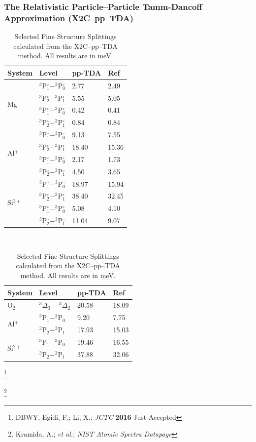 \documentclass[usepdftitle=false,10pt]{beamer}
\newcommand\blfootnote[1]{%
  \begingroup
  \renewcommand\thefootnote{}\footnote{#1}%
  \addtocounter{footnote}{-1}%
  \endgroup
}
\begin{document}
\begin{frame}
  \frametitle{The Relativistic Particle--Particle Tamm-Dancoff Approximation 
  (X2C--pp--TDA)}
  {\scriptsize
  \begin{table}
    \centering
    \begin{tabular}{llll}
    System                    & Level                              & pp-TDA & Ref\\
    \hline
    \multirow{4}{*}{Mg}        & $^3$P$^\circ_{1}-^3$P$^\circ_{0}$  & 2.77  & 2.49 \\
                               & $^3$P$^\circ_{2}-^3$P$^\circ_{1}$  & 5.55  & 5.05 \\
                               & $^3$P$^\circ_{1}-^3$P$^\circ_{0}$  & 0.42  & 0.41 \\
                               & $^3$P$^\circ_{2}-^3$P$^\circ_{1}$  & 0.84  & 0.84 \\
    \hline
    \multirow{4}{*}{Al$^+$}    & $^3$P$^\circ_{1}-^3$P$^\circ_{0}$  & 9.13   & 7.55  \\
                               & $^3$P$^\circ_{2}-^3$P$^\circ_{1}$  & 18.40  & 15.36 \\
                               & $^3$P$^\circ_{1}-^3$P$^\circ_{0}$  & 2.17   & 1.73  \\
                               & $^3$P$^\circ_{2}-^3$P$^\circ_{1}$  & 4.50   & 3.65  \\
    \hline
    \multirow{4}{*}{Si$^{2+}$} & $^3$P$^\circ_{1}-^3$P$^\circ_{0}$  & 18.97  & 15.94 \\
                               & $^3$P$^\circ_{2}-^3$P$^\circ_{1}$  & 38.40  & 32.45 \\
                               & $^3$P$^\circ_{1}-^3$P$^\circ_{0}$  & 5.08   & 4.10  \\
                               & $^3$P$^\circ_{2}-^3$P$^\circ_{1}$  & 11.04  & 9.07  \\
    \hline
    \end{tabular} $\quad$
    \begin{tabular}{llll}
    System                    & Level & pp-TDA & Ref\\
    \hline
     O$_2$ & $^3\Delta_3-{^3\Delta_2}$ & 20.58 & 18.09 \\ \hline
     \multirow{2}{*}{Al$^+$} & $^3$P$_1-^3$P$_0$ & 9.20 & 7.75 \\ 
     & $^3$P$_2-^3$P$_1$ & 17.93 & 15.03 \\  \hline
     \multirow{2}{*}{Si$^{2+}$} & $^3$P$_1-^3$P$_0$ & 19.46 & 16.55 \\ 
     & $^3$P$_2-^3$P$_1$ & 37.88 & 32.06 \\    \hline
    \end{tabular}
    \caption{Selected Fine Structure Splittings calculated from the X2C--pp--TDA method. All results are in meV.}
  \end{table}
  }
  \blfootnote{\tiny DBWY, Egidi, F.; Li, X.; \emph{JCTC} \textbf{2016} Just Accepted}
  \blfootnote{\tiny Kramida, A.; \emph{et al.}; \emph{NIST Atomic Spectra Datapage}}
\end{frame}
\end{document}
